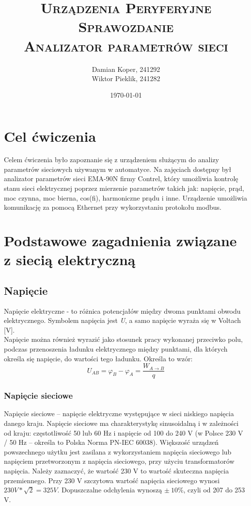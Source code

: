 \documentclass[12pt]{article}
\title{ 
    \vspace*{55mm}
    \textsc{
        \textbf{Urządzenia Peryferyjne}\\
        \large Sprawozdanie  \\
        \Large Analizator parametrów sieci
        }
}
\author{
Damian Koper,  241292\\
Wiktor Pieklik, 241282\\
}
\date{\today}
\begin{document}
\maketitle


\newpage
\setcounter{tocdepth}{2}
\localtableofcontents
\listoffigures
\lstlistoflistings

\newpage

\section{Cel ćwiczenia}
Celem ćwiczenia było zapoznanie się z urządzeniem służącym do analizy parametrów sieciowych używanym w automatyce. Na zajęciach dostępny był analizator parametrów sieci EMA-90N firmy Contrel, który umożliwia kontrolę stanu sieci elektrycznej poprzez mierzenie parametrów takich jak: napięcie, prąd, moc czynna, moc bierna, cos(fi), harmoniczne prądu i inne. Urządzenie umożliwia komunikację za pomocą Ethernet przy wykorzystaniu protokołu modbus.
\section{Podstawowe zagadnienia związane z siecią elektryczną}
\subsection{Napięcie}
Napięcie elektryczne - to różnica potencjałów między dwoma punktami obwodu elektrycznego. Symbolem napięcia jest \textit{U}, a samo napięcie wyraża się w Voltach [V].\\
Napięcie można również wyrazić jako stosunek pracy wykonanej przeciwko polu, podczas przenoszenia ładunku elektrycznego między punktami, dla których określa się napięcie, do wartości tego ładunku. Określa to wzór:\\
\begin{equation}
    U_{AB} = \varphi_B - \varphi_A = \frac{W_{A \rightarrow B}}{q}
\end{equation}
\subsubsection{Napięcie sieciowe}
Napięcie sieciowe – napięcie elektryczne występujące w sieci niskiego napięcia danego kraju. Napięcie sieciowe ma charakterystykę sinusoidalną i w zależności od kraju: częstotliwość 50 lub 60 Hz i napięcie od 100 do 240 V (w Polsce 230 V / 50 Hz – określa to Polska Norma PN-IEC 60038). Większość urządzeń powszechnego użytku jest zasilana z wykorzystaniem napięcia sieciowego lub napięciem przetworzonym z napięcia sieciowego, przy użyciu transformatorów napięcia. Należy zaznaczyć, że wartość 230 V to wartość skuteczna napięcia przemiennego. Przy 230 V szczytowa wartość napięcia sieciowego wynosi $230 V * \sqrt{2} = 325 V$. Dopuszczalne odchylenia wynoszą $\pm\ 10\%$, czyli od 207 do 253 V.
\end{document}
